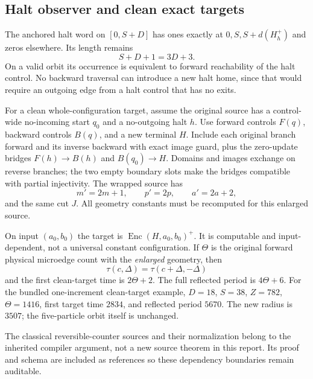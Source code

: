 \documentclass[11pt,a4paper]{article}
\numberwithin{equation}{section}
\begin{document}
\subsection{Halt observer and clean exact targets}
The anchored halt word on $[0,S+D]$ has ones exactly at $0,S,S+d(H_h^+)$ and zeros elsewhere. Its length remains
\[
 S+D+1=3D+3.
\]
On a valid orbit its occurrence is equivalent to forward reachability of the halt control. No backward traversal can introduce a new halt home, since that would require an outgoing edge from a halt control that has no exits.

For a clean whole-configuration target, assume the original source has a control-wide no-incoming start $q_0$ and a no-outgoing halt $h$. Use forward controls $F(q)$, backward controls $B(q)$, and a new terminal $H$. Include each original branch forward and its inverse backward with exact image guard, plus the zero-update bridges $F(h)\to B(h)$ and $B(q_0)\to H$. Domains and images exchange on reverse branches; the two empty boundary slots make the bridges compatible with partial injectivity. The wrapped source has
\[
 m'=2m+1,\qquad p'=2p,\qquad a'=2a+2,
\]
and the same cut $J$. All geometry constants must be recomputed for this enlarged source.

On input $(a_0,b_0)$ the target is $\operatorname{Enc}(H,a_0,b_0)^+$. It is computable and input-dependent, not a universal constant configuration. If $\Theta$ is the original forward physical microedge count with the \emph{enlarged} geometry, then
\[
 \tau(c,\Delta)=\tau(c+\Delta,-\Delta)
\]
and the first clean-target time is $2\Theta+2$. The full reflected period is $4\Theta+6$. For the bundled one-increment clean-target example, $D=18$, $S=38$, $Z=782$, $\Theta=1416$, first target time $2834$, and reflected period $5670$. The new radius is $3507$; the five-particle orbit itself is unchanged.

The classical reversible-counter sources and their normalization belong to the inherited compiler argument, not a new source theorem in this report. Its proof and schema are included as references so these dependency boundaries remain auditable.
\end{document}
